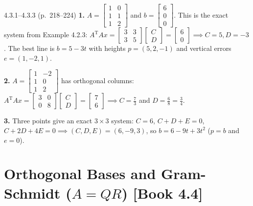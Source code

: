 \documentclass[11pt,a4paper,openany,oneside]{book}
\def\vect#1{#1}%
\def\uv#1{#1}%
\def\mathbf#1{#1}%
\def\bk#1{ [Book #1]}%
\newcommand{\vect}[1]{\mathbf{#1}}
\newcommand{\uv}[1]{\hat{\mathbf{#1}}}
\newcommand{\T}{\mathrm{T}}
\numberwithin{equation}{chapter}
\newcommand{\bk}[1]{\texorpdfstring{\enspace{\normalfont\small\color{slate}[Book #1]}}{ [Book #1]}}
\begin{document}
\vfill
\begin{pageend_sol}{4.3.1--4.3.3 (p.\ 218--224)}
\textbf{1.} $A = \begin{bmatrix}1&0\\1&1\\1&2\end{bmatrix}$ and $\vect{b} = \begin{bmatrix}6\\0\\0\end{bmatrix}$. This is the exact system from Example 4.2.3: $A^\T A\uv{\vect{x}} = \begin{bmatrix}3&3\\3&5\end{bmatrix}\begin{bmatrix}C\\D\end{bmatrix} = \begin{bmatrix}6\\0\end{bmatrix} \implies C=5, D=-3$. The best line is $b = 5 - 3t$ with heights $\vect{p}=(5,2,-1)$ and vertical errors $\vect{e}=(1,-2,1)$.

\textbf{2.} $A = \begin{bmatrix}1&-2\\1&0\\1&2\end{bmatrix}$ has orthogonal columns: $A^\T A\uv{\vect{x}} = \begin{bmatrix}3&0\\0&8\end{bmatrix}\begin{bmatrix}C\\D\end{bmatrix} = \begin{bmatrix}7\\6\end{bmatrix} \implies C = \frac{7}{3}$ and $D = \frac{6}{8} = \frac{3}{4}$.

\textbf{3.} Three points give an exact $3\times 3$ system: $C=6$, $C+D+E=0$, $C+2D+4E=0 \implies (C,D,E) = (6,-9,3)$, so $b = 6 - 9t + 3t^2$ ($\vect{p}=\vect{b}$ and $\vect{e}=\vect{0}$).
\end{pageend_sol}
\clearpage

\section{Orthogonal Bases and Gram-Schmidt ($A = QR$)\bk{4.4}}
\end{document}
